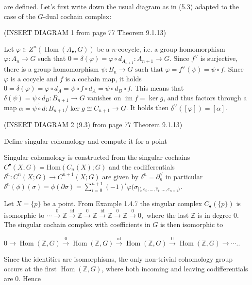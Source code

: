 are defined. Let's first write down the usual diagram as in (5.3) adapted to the case of the \(G\)-dual cochain complex:

(INSERT DIAGRAM 1 from page 77 Theorem 9.1.13)

Let \(\varphi \in Z^n(\operatorname{Hom}(A_\bullet, G))\) be a \( n \)-cocycle, i.e. a group homomorphism \( \varphi \colon A_n \to G \) such that 
\(0 = \delta(\varphi) = \varphi \circ d_{A_{n+1}} \colon A_{n+1} \to G.\)
Since \(f^\vee\) is surjective, there is a group homomorphism 
\(\psi \colon B_n \to G \text{ such that } \varphi = f^\vee(\psi) = \psi \circ f.\)
Since \(\varphi\) is a cocycle and \( f \) is a cochain map, it holds
\(0 = \delta(\varphi) = \varphi \circ d_A = \psi \circ f \circ d_A = \psi \circ d_B \circ f.\)
This means that \(\delta(\psi) = \psi \circ d_B \colon B_{n+1} \to G\) vanishes on \(\operatorname{im} f = \ker g\), 
and thus factors through a map \(\alpha = \widetilde{\psi \circ d} \colon B_{n+1}/ \ker g \cong C_{n+1} \to G\). 
It holds then \(\delta^\vee([\varphi]) = [\alpha]\).

(INSERT DIAGRAM 2 (9.3) from page 77 Theorem 9.1.13)


Define singular cohomology and compute it for a point

Singular cohomology is constructed from the singular cochains \( C^\bullet(X;G) = \text{Hom}(C_n(X);G) \) and the codifferentials
\( \delta^n : C^n(X;G) \to C^{n+1}(X;G) \) are given by \( \delta^n = \partial_n^\vee \) in particular
\( \delta^n(\phi)(\sigma) = \phi(\partial \sigma) = \sum_{i=0}^{n+1} (-1)^i\varphi(\sigma_{|\langle, e_0, \dots, \hat{e}_i, \dots, e_{n=1} \rangle}\).

Let \( X = \{p\} \) be a point. From Example 1.4.7 the singular complex \( C_{\bullet}(\{p\}) \) is isomorphic to
\(\cdots \xrightarrow{0} \mathbb{Z} \xrightarrow{\text{id}} \mathbb{Z} \xrightarrow{0} \mathbb{Z} \xrightarrow{\text{id}} \mathbb{Z} \xrightarrow{0} \mathbb{Z} \xrightarrow{0} 0, \)
where the last \(\mathbb{Z}\) is in degree \( 0 \). The singular cochain complex with coefficients in \(G\) is then isomorphic to

\(0 \longrightarrow \operatorname{Hom}(\mathbb{Z}, G) \xrightarrow{0} \operatorname{Hom}(\mathbb{Z}, G) \xrightarrow{\text{id}} \operatorname{Hom}(\mathbb{Z}, G) \xrightarrow{0} \operatorname{Hom}(\mathbb{Z}, G) \longrightarrow \dotsb .\).

Since the identities are isomorphisms, the only non-trivial cohomology group occurs at the first $\operatorname{Hom}(\mathbb{Z}, G)$, where both incoming and leaving codifferentials are 0. Hence

